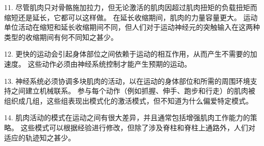 11. 尽管肌肉只对骨骼施加拉力，但无论激活的肌肉因超过肌肉扭矩的负载扭矩而缩短还是延长，它都可以这样做。
在延长收缩期间，肌肉的力量容量更大。
运动单位活动在缩短和延长收缩期间不同，但人们对于运动神经元的突触输入在这两种类型的收缩期间有何不同知之甚少。


12. 更快的运动会引起身体部位之间依赖于运动的相互作用，从而产生不需要的加速度。
这些动作必须由神经系统控制才能产生预期的运动。


13. 神经系统必须协调多块肌肉的活动，以在运动的身体部位和所需的周围环境支持之间建立机械联系。
参与每个动作（例如抓握、伸手、跑步和行走）的肌肉被组织成几组，这些组表现出模式化的激活模式，但不知道为什么偏爱特定模式。


14. 肌肉活动的模式在运动之间有很大差异，并且通常包括增强肌肉工作能力的策略。
这些模式可以根据经验进行修改，但除了涉及脊柱和脊柱上通路外，人们对适应的轨迹知之甚少。


